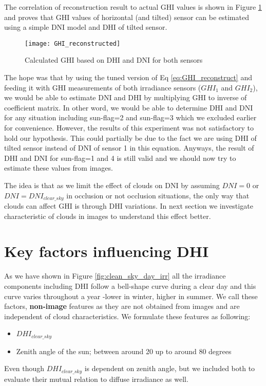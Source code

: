 The correlation of reconstruction result to actual GHI values is shown in Figure \ref{fig:GHI_reconstruct_result} and proves that GHI values of horizontal (and tilted) sensor can be estimated using a simple DNI model and DHI of tilted sensor.


\begin{figure}[h]
\caption{Calculated GHI based on DHI and DNI for both sensors}
\label{fig:GHI_reconstruct_result}
\texttt{[image: GHI\_reconstructed]}
\centering
\end{figure}

The hope was that by using the tuned version of Eq \ref{eq:GHI_reconstruct} and feeding it with GHI measurements of both irradiance sensors ($GHI_1$ and $GHI_2$), we would be able to estimate DNI and DHI by multiplying GHI to inverse of coefficient matrix. In other word, we would be able to determine DHI and DNI for any situation including sun-flag=2 and sun-flag=3 which we excluded earlier for convenience. However, the results of this experiment was not satisfactory to hold our hypothesis. This could partially be due to the fact we are using DHI of tilted sensor instead of DNI of sensor 1 in this equation. Anyways, the result of DHI and DNI for sun-flag=1 and 4 is still valid and we should now try to estimate these values from images.

The idea is that as we limit the effect of clouds on DNI by assuming $DNI=0$ or $DNI=DNI_{clear\_sky}$ in occlusion or not occlusion situations, the only way that clouds can affect GHI is through DHI variations. In next section we investigate characteristic of clouds in images to understand this effect better.

\section{Key factors influencing DHI}
\label{sec:img-features}
As we have shown in Figure \ref{fig:clean_sky_day_irr} all the irradiance components including DHI follow a bell-shape curve during a clear day and this curve varies throughout a year -lower in winter, higher in summer. We call these factors, \textbf{non-image} features as they are not obtained from images and are independent of cloud characteristics. We formulate these features as following:
\begin{itemize}
\item $DHI_{clear\_sky}$
\item Zenith angle of the sun; between around 20 up to around 80 degrees
\end{itemize}
Even though $DHI_{clear\_sky}$ is dependent on zenith angle, but we included both to evaluate their mutual relation to diffuse irradiance as well.


